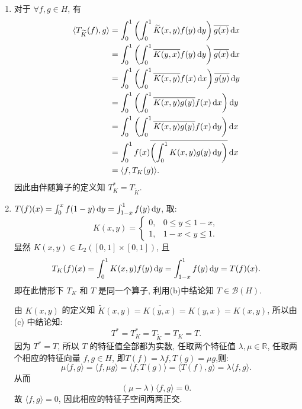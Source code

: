 \begin{enumerate}
\begin{answer}
\begin{enumerate}
    
        \item 对于 $\forall f,g\in H$, 有
        \begin{align*}
            \langle T_{\widetilde{K}}(f),g\rangle&=\int_0^1\left(\int_0^1\widetilde{K}(x,y)f(y)\diff y\right)\conjugate{g(x)}\diff x\\
            &=\int_0^1\left(\int_0^1\overline{K(y,x)}f(y)\diff y\right)\conjugate{g(x)}\diff x \\
            &=\int_0^1\left(\int_0^1\overline{K(x,y)}f(x)\diff x\right)\conjugate{g(y)}\diff y \\
            &=\int_0^1\left(\int_0^1\overline{K(x,y)g(y)}f(x)\diff x\right)\diff y \\
            &=\int_0^1\left(\int_0^1\overline{K(x,y)g(y)}f(x)\diff y\right)\diff x \\
            &=\int_0^1f(x)\overline{\left(\int_0^1K(x,y)g(y)\diff y\right)}\diff x \\
            &=\langle f,T_K(g)\rangle.
        \end{align*}
        因此由伴随算子的定义知 $T_K^{*}=T_{\widetilde{K}}$.
    
        \item $T(f)(x)=\int_0^x f(1-y)\mathop{}\!\mathrm{d} y=\int_{1-x}^1 f(y)\mathop{}\!\mathrm{d} y$, 取:
        \[K(x,y)=
        \begin{cases}
        0, & 0\leq y\leq 1-x,\\
        1, & 1-x<y\leq 1.
        \end{cases}\]
        显然 $K(x,y)\in L_2([0,1]\times [0,1])$, 且
        \[T_K(f)(x)=\int_0^1 K(x,y)f(y)\mathop{}\!\mathrm{d} y=\int_{1-x}^1 f(y)\mathop{}\!\mathrm{d} y=T(f)(x).\]
        即在此情形下 $T_K$ 和 $T$ 是同一个算子, 利用(b)中结论知 $T\in\mathcal{B}(H)$.
    
        由 $K(x,y)$ 的定义知 $\widetilde{K}(x,y)=\overline{K(y,x)}=K(y,x)=K(x,y)$, 所以由 (c) 中结论知:
        \[T^{*}=T_K^{*}=T_{\widetilde{K}}=T_K=T.\]
        因为 $T^{*}=T$, 所以 $T$ 的特征值全部都为实数, 
        任取两个特征值 $\lambda,\mu\in\mathbb{R}$, 任取两个相应的特征向量 $f,g\in H$, 
        即$T(f)=\lambda f,T(g)=\mu g$,则:
        \[\mu\langle f,g\rangle=\langle f,\mu g\rangle=\langle f,T(g)\rangle=\langle T(f),g\rangle=\lambda\langle f,g\rangle.\]
        从而
        \[(\mu-\lambda)\langle f,g\rangle=0.\]
        故 $\langle f,g\rangle=0$, 因此相应的特征子空间两两正交.
    

\end{enumerate}
\end{answer}
\end{enumerate}
